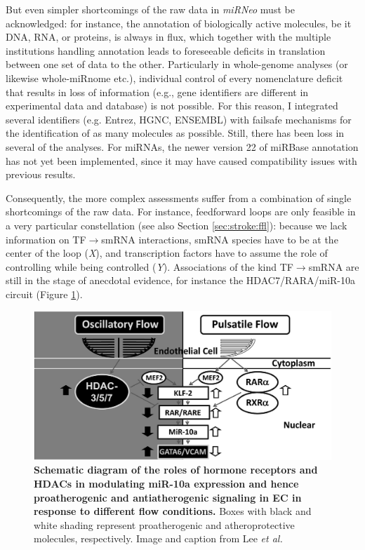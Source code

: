 But even simpler shortcomings of the raw data in \emph{miRNeo} must be acknowledged: for instance, the annotation of biologically active molecules, be it DNA, RNA, or proteins, is always in flux, which together with the multiple institutions handling annotation leads to foreseeable deficits in translation between one set of data to the other. Particularly in whole-genome analyses (or likewise whole-miRnome etc.), individual control of every nomenclature deficit that results in loss of information (e.g., gene identifiers are different in experimental data and database) is not possible. For this reason, I integrated several identifiers (e.g. Entrez, HGNC, ENSEMBL) with failsafe mechanisms for the identification of as many molecules as possible. Still, there has been loss in several of the analyses. For miRNAs, the newer version 22 of miRBase annotation has not yet been implemented, since it may have caused compatibility issues with previous results.

Consequently, the more complex assessments suffer from a combination of single shortcomings of the raw data. For instance, feedforward loops are only feasible in a very particular constellation (see also Section \ref{sec:stroke:ffl}): because we lack information on TF$\to$smRNA interactions, smRNA species have to be at the center of the loop (\emph{X}), and transcription factors have to assume the role of controlling while being controlled (\emph{Y}). Associations of the kind TF$\to$smRNA are still in the stage of anecdotal evidence, for instance the HDAC7/RARA/miR-10a circuit (Figure \ref{fig:mir10-circuit}).\cite{Lee2017}

\begin{figure}
\centering
\includegraphics[width=.7\textwidth]{figures/mir10-circuit}
\caption[HDAC7/RARA/miR-10a Circuit.]{\textbf{Schematic diagram of the roles of hormone receptors and HDACs in modulating miR-10a expression and hence proatherogenic and antiatherogenic signaling in EC in response to different flow conditions.} Boxes with black and white shading represent proatherogenic and atheroprotective molecules, respectively. Image and caption from Lee \emph{et al.}\cite{Lee2017}
\label{fig:mir10-circuit}}
\end{figure}

